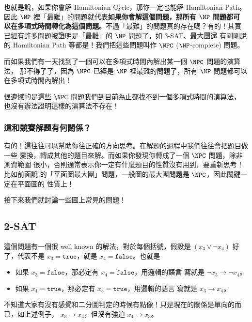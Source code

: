 \documentclass[a4paper,12pt]{book}
\begin{document}
也就是說，如果你會解 Hamiltonian Cycle，那你一定也能解 Hamiltonian Path。因此
$\NP$ 裡「最難」的問題就代表{\bf 如果你會解這個問題，那所有 $\NP$ 問題都可
  以在多項式時間轉化為這個問題。}不過「最難」的問題真的存在嗎？有的！其實
已經有許多問題被證明是「最難」的 $\NP$ 問題了，如 3-SAT、最大團還
有剛剛說的 Hamiltonian Path 等都是！我們把這些問題叫作 $\NPC$ ($\NP$-complete)
問題。

而如果我們有一天找到了一個可以在多項式時間內解出某一個 $\NPC$ 問題的演算法，
那不得了了，因為 $\NPC$ 已經是 $\NP$ 裡最難的問題了，所有 $\NP$ 問題都可以
在多項式時間內解出！

很遺憾的是這些 $\NPC$ 問題我們到目前為止都找不到一個多項式時間的演算法，
也沒有辦法證明這樣的演算法不存在！

\subsubsection{這和競賽解題有何關係？}
有的！這往往可以幫助你往正確的方向思考。在解題的過程中我們往往會把題目做一些
變換，轉成其他的題目來解。而如果你發現你轉成了一個 $\NPC$ 問題，除非測資範圍
很小，否則通常表示你一定有什麼題目的性質沒有用到，要重新思考！比如前面說
的「平面圖最大團」問題，一般圖的最大團問題是 $\NPC$，因此關鍵一定在平面圖的
性質上！

接下來我們就討論一些圖上常見的問題！

\subsection{2-SAT}
這個問題有一個很 well known 的解法，對於每個括號，假設是 $(x_3 \lor \lnot x_4)$
好了，代表不是 $x_3 = \texttt{true}$，就是 $x_4 = \texttt{false}$。也就是
\begin{itemize}
  \item 如果 $x_3 = \texttt{false}$，那必定有 $x_4 = \texttt{false}$，用邏輯的語言
    寫就是 $\lnot x_3 \rightarrow \lnot x_4$。
  \item 如果 $x_4 = \texttt{true}$，那必定有 $x_3 = \texttt{true}$，用邏輯的語言
    寫就是 $x_3 \rightarrow x_4$。
\end{itemize}
不知道大家有沒有感覺和二分圖判定的時候有點像！只是現在的關係是單向的而已，如上述例子，
$x_3 \rightarrow x_4$，但沒有強迫 $x_4 \to x_3$。
\end{document}
